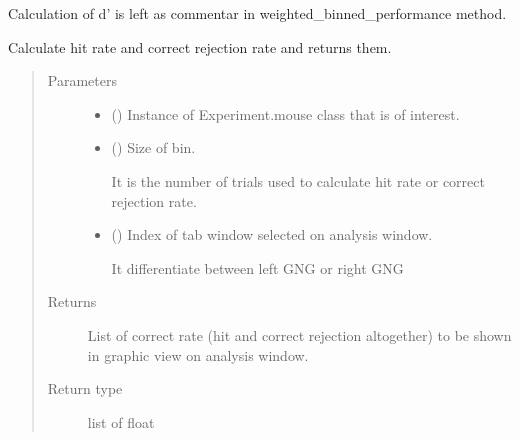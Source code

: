 \documentclass[letterpaper,10pt,english]{sphinxmanual}
\begin{document}
\sphinxAtStartPar
Calculation of d’ is left as commentar in
weighted\_binned\_performance method.

\begin{fulllineitems}
\label{\detokenize{NoSeMazeControl/Analysis:Analysis.Analysis.binned_performance}}
\pysigstartsignatures
{}
\pysigstopsignatures
\sphinxAtStartPar
Calculate hit rate and correct rejection rate and returns them.
\begin{quote}\begin{description}
\item[{Parameters}] \leavevmode\begin{itemize}
\item {} 
\sphinxAtStartPar
{} () \textendash{} Instance of Experiment.mouse class that is of interest.

\item {} 
\sphinxAtStartPar
{} () \textendash{} 
\sphinxAtStartPar
Size of bin.

\sphinxAtStartPar
It is the number of trials used to calculate hit rate or
correct rejection rate.


\item {} 
\sphinxAtStartPar
{} () \textendash{} 
\sphinxAtStartPar
Index of tab window selected on analysis window.

\sphinxAtStartPar
It differentiate between left GNG or right GNG


\end{itemize}

\item[{Returns}] \leavevmode
\sphinxAtStartPar
{} \textendash{} List of correct rate (hit and correct rejection altogether) to be shown
in graphic view on analysis window.

\item[{Return type}] \leavevmode
\sphinxAtStartPar
list of float

\end{description}\end{quote}

\end{fulllineitems}
\end{document}
